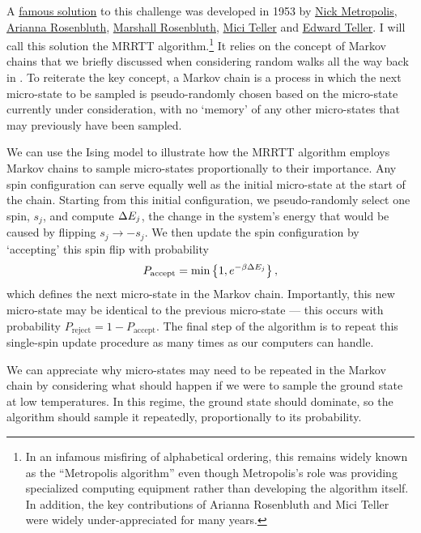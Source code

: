 A \href{https://en.wikipedia.org/wiki/Equation_of_State_Calculations_by_Fast_Computing_Machines}{famous solution} to this challenge was developed in 1953 by \href{https://en.wikipedia.org/wiki/Nicholas_Metropolis}{Nick Metropolis}, \href{https://en.wikipedia.org/wiki/Arianna_W._Rosenbluth}{Arianna Rosenbluth}, \href{https://en.wikipedia.org/wiki/Marshall_Rosenbluth}{Marshall Rosenbluth}, \href{https://en.wikipedia.org/wiki/Augusta_H._Teller}{Mici Teller} and \href{https://en.wikipedia.org/wiki/Edward_Teller}{Edward Teller}.
I will call this solution the MRRTT algorithm.\footnote{In an infamous misfiring of alphabetical ordering, this remains widely known as the ``Metropolis algorithm'' even though Metropolis's role was providing specialized computing equipment rather than developing the algorithm itself.  In addition, the key contributions of Arianna Rosenbluth and Mici Teller were widely under-appreciated for many years.}
It relies on the concept of Markov chains that we briefly discussed when considering random walks all the way back in .
To reiterate the key concept, a Markov chain is a process in which the next micro-state to be sampled is pseudo-randomly chosen based on the micro-state currently under consideration, with no `memory' of any other micro-states that may previously have been sampled.

We can use the Ising model to illustrate how the MRRTT algorithm employs Markov chains to sample micro-states proportionally to their importance.
Any spin configuration can serve equally well as the initial micro-state at the start of the chain.
Starting from this initial configuration, we pseudo-randomly select one spin, $s_j$, and compute $\Delta E_j$, the change in the system's energy that would be caused by flipping $s_j \to -s_j$.
We then update the spin configuration by `accepting' this spin flip with probability
\begin{equation}
  \label{eq:MRRTTprob}
  P_{\text{accept}} = \mbox{min}\left\{1, e^{-\beta \Delta E_j}\right\},
\end{equation}
which defines the next micro-state in the Markov chain.
Importantly, this new micro-state may be identical to the previous micro-state --- this occurs with probability $P_{\text{reject}} = 1 - P_{\text{accept}}$.
The final step of the algorithm is to repeat this single-spin update procedure as many times as our computers can handle.

We can appreciate why micro-states may need to be repeated in the Markov chain by considering what should happen if we were to sample the ground state at low temperatures.
In this regime, the ground state should dominate, so the algorithm should sample it repeatedly, proportionally to its probability.

